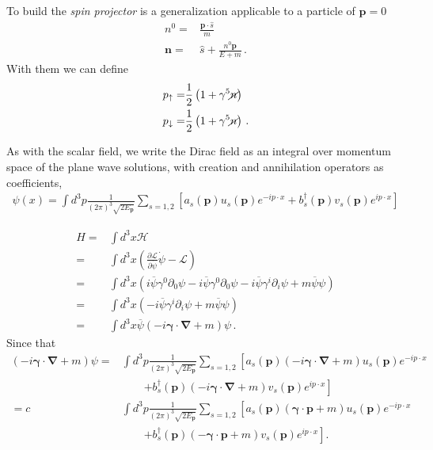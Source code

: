 To build the \emph{spin projector} is a generalization applicable to a
particle of $\mathbf{p}=0$
\begin{align*}
  n^0       =&\frac{\mathbf{p}\cdot\hat{s}}{m}\nonumber\\
  \mathbf{n}=&\hat{s}+\frac{n^0\mathbf{p}}{E+m}\,.
\end{align*}
With them we can define
\begin{align*}
  p_{\uparrow}=&\frac{1}{2} \left(1+\gamma^5\cancel{n}  \right)\nonumber\\
  p_{\downarrow}=&\frac{1}{2} \left(1+\gamma^5\cancel{n}  \right)\,.
\end{align*}



\begin{frame}
As with the scalar field, we write the Dirac field as an integral over momentum space of the plane wave solutions, with creation and annihilation operators as coefficients,
\begin{align}
  \psi(x)=\int d^3p\frac{1}{(2\pi)^3\sqrt{2 E_{\mathbf{p}}}}\sum_{s=1,2}\left[a_s(\mathbf{p})u_s(\mathbf{p})e^{-i p\cdot x}
+b_s^\dagger(\mathbf{p})v_s(\mathbf{p})e^{i p\cdot x}\right]
\end{align}
\end{frame}
\begin{align}
  H=&\int d^3x \mathcal{H}\nonumber\\
=&\int d^3x\left(\frac{\partial \mathcal{L}}{\partial\dot\psi}\dot\psi -\mathcal{L}\right)\nonumber\\
  =&\int d^3x\left(i\overline{\psi}\gamma^0\partial_0\psi
-i\overline{\psi}\gamma^0\partial_0\psi-i\overline{\psi}\gamma^i\partial_i\psi+m\overline{\psi}\psi\right)\nonumber\\
 =&\int d^3x\left(-i\overline{\psi}\gamma^i\partial_i\psi+m\overline{\psi}\psi\right)\nonumber\\
 =&\int d^3x\overline{\psi}\left(-i\boldsymbol{\gamma}\cdot\boldsymbol{\nabla}+m\right)\psi\,.
\end{align}
Since that
\begin{align}
\label{eq:180}
  \left(-i\boldsymbol{\gamma}\cdot\boldsymbol{\nabla}+m\right)\psi=&
\int d^3p\frac{1}{(2\pi)^3\sqrt{2 E_{\mathbf{p}}}}\sum_{s=1,2}\left[a_s(\mathbf{p})\left(-i\boldsymbol{\gamma}\cdot\boldsymbol{\nabla}+m\right)u_s(\mathbf{p})e^{-i p\cdot x}\right.\nonumber\\
&\qquad\left.+b_s^\dagger(\mathbf{p})\left(-i\boldsymbol{\gamma}\cdot\boldsymbol{\nabla}+m\right)v_s(\mathbf{p})e^{i p\cdot x}\right]\nonumber\\
=c&\int d^3p\frac{1}{(2\pi)^3\sqrt{2 E_{\mathbf{p}}}}\sum_{s=1,2}\left[a_s(\mathbf{p})\left(\boldsymbol{\gamma}\cdot\mathbf{p}+m\right)u_s(\mathbf{p})e^{-i p\cdot x}\right.\nonumber\\
&\qquad\left.+b_s^\dagger(\mathbf{p})\left(-\boldsymbol{\gamma}\cdot\mathbf{p}+m\right)v_s(\mathbf{p})e^{i p\cdot x}\right].  
\end{align}
